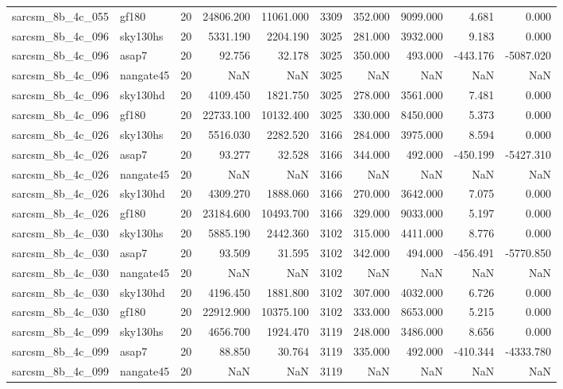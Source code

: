 \begin{tabular}{llrrrrrrrr}
sarcsm\_8b\_4c\_055 & gf180 & 20 & 24806.200 & 11061.000 & 3309 & 352.000 & 9099.000 & 4.681 & 0.000 \\
sarcsm\_8b\_4c\_096 & sky130hs & 20 & 5331.190 & 2204.190 & 3025 & 281.000 & 3932.000 & 9.183 & 0.000 \\
sarcsm\_8b\_4c\_096 & asap7 & 20 & 92.756 & 32.178 & 3025 & 350.000 & 493.000 & -443.176 & -5087.020 \\
sarcsm\_8b\_4c\_096 & nangate45 & 20 & NaN & NaN & 3025 & NaN & NaN & NaN & NaN \\
sarcsm\_8b\_4c\_096 & sky130hd & 20 & 4109.450 & 1821.750 & 3025 & 278.000 & 3561.000 & 7.481 & 0.000 \\
sarcsm\_8b\_4c\_096 & gf180 & 20 & 22733.100 & 10132.400 & 3025 & 330.000 & 8450.000 & 5.373 & 0.000 \\
sarcsm\_8b\_4c\_026 & sky130hs & 20 & 5516.030 & 2282.520 & 3166 & 284.000 & 3975.000 & 8.594 & 0.000 \\
sarcsm\_8b\_4c\_026 & asap7 & 20 & 93.277 & 32.528 & 3166 & 344.000 & 492.000 & -450.199 & -5427.310 \\
sarcsm\_8b\_4c\_026 & nangate45 & 20 & NaN & NaN & 3166 & NaN & NaN & NaN & NaN \\
sarcsm\_8b\_4c\_026 & sky130hd & 20 & 4309.270 & 1888.060 & 3166 & 270.000 & 3642.000 & 7.075 & 0.000 \\
sarcsm\_8b\_4c\_026 & gf180 & 20 & 23184.600 & 10493.700 & 3166 & 329.000 & 9033.000 & 5.197 & 0.000 \\
sarcsm\_8b\_4c\_030 & sky130hs & 20 & 5885.190 & 2442.360 & 3102 & 315.000 & 4411.000 & 8.776 & 0.000 \\
sarcsm\_8b\_4c\_030 & asap7 & 20 & 93.509 & 31.595 & 3102 & 342.000 & 494.000 & -456.491 & -5770.850 \\
sarcsm\_8b\_4c\_030 & nangate45 & 20 & NaN & NaN & 3102 & NaN & NaN & NaN & NaN \\
sarcsm\_8b\_4c\_030 & sky130hd & 20 & 4196.450 & 1881.800 & 3102 & 307.000 & 4032.000 & 6.726 & 0.000 \\
sarcsm\_8b\_4c\_030 & gf180 & 20 & 22912.900 & 10375.100 & 3102 & 333.000 & 8653.000 & 5.215 & 0.000 \\
sarcsm\_8b\_4c\_099 & sky130hs & 20 & 4656.700 & 1924.470 & 3119 & 248.000 & 3486.000 & 8.656 & 0.000 \\
sarcsm\_8b\_4c\_099 & asap7 & 20 & 88.850 & 30.764 & 3119 & 335.000 & 492.000 & -410.344 & -4333.780 \\
sarcsm\_8b\_4c\_099 & nangate45 & 20 & NaN & NaN & 3119 & NaN & NaN & NaN & NaN \\

\end{tabular}
